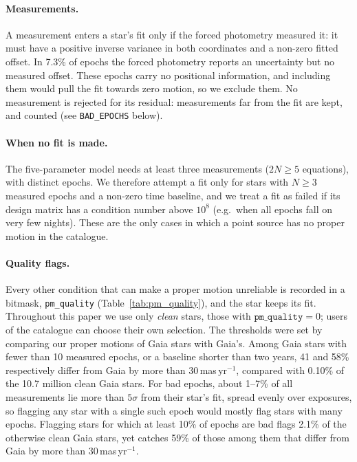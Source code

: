 \documentclass[usenatbib]{mnras}   %
\begin{document}
\paragraph*{Measurements.} A measurement enters a star's fit only if the forced photometry measured it: it must have a positive inverse variance in both coordinates and a non-zero fitted offset. In 7.3\% of epochs the forced photometry reports an uncertainty but no measured offset. These epochs carry no positional information, and including them would pull the fit towards zero motion, so we exclude them. No measurement is rejected for its residual: measurements far from the fit are kept, and counted (see \texttt{BAD\_EPOCHS} below).

\paragraph*{When no fit is made.} The five-parameter model needs at least three measurements ($2N \geq 5$ equations), with distinct epochs. We therefore attempt a fit only for stars with $N \geq 3$ measured epochs and a non-zero time baseline, and we treat a fit as failed if its design matrix has a condition number above $10^8$ (e.g.\ when all epochs fall on very few nights). These are the only cases in which a point source has no proper motion in the catalogue.

\paragraph*{Quality flags.} Every other condition that can make a proper motion unreliable is recorded in a bitmask, \texttt{pm\_quality} (Table~\ref{tab:pm_quality}), and the star keeps its fit. Throughout this paper we use only \emph{clean} stars, those with $\texttt{pm\_quality} = 0$; users of the catalogue can choose their own selection. The thresholds were set by comparing our proper motions of Gaia stars with Gaia's. Among Gaia stars with fewer than 10 measured epochs, or a baseline shorter than two years, 41 and 58\% respectively differ from Gaia by more than 30\,mas\,yr$^{-1}$, compared with 0.10\% of the 10.7 million clean Gaia stars. For bad epochs, about 1--7\% of all measurements lie more than $5\sigma$ from their star's fit, spread evenly over exposures, so flagging any star with a single such epoch would mostly flag stars with many epochs. Flagging stars for which at least 10\% of epochs are bad flags 2.1\% of the otherwise clean Gaia stars, yet catches 59\% of those among them that differ from Gaia by more than 30\,mas\,yr$^{-1}$.
\end{document}

